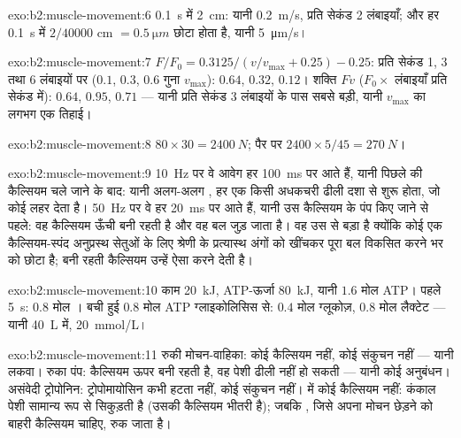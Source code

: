 \begin{solution}{exo:b2:muscle-movement:6}
\qty{0.1}{s} में \qty{2}{cm}: यानी \qty{0.2}{m/s}, प्रति सेकंड 2 लंबाइयाँ; और हर
 \qty{0.1}{s} में $2/\num{40000}$ cm $= \qty{0.5}{\micro m}$ छोटा
होता है, यानी \qty{5}{\micro m/s}।
\end{solution}

\begin{solution}{exo:b2:muscle-movement:7}
$F/F_0 = 0.3125/(v/v_{\max} + 0.25) - 0.25$: प्रति सेकंड 1, 3 तथा 6
लंबाइयों पर ($0.1$, $0.3$, $0.6$ गुना $v_{\max}$): $0.64$, $0.32$, $0.12$।
शक्ति $Fv$ ($F_0\times$ लंबाइयाँ प्रति सेकंड में): $0.64$, $0.95$, $0.71$
--- यानी प्रति सेकंड 3 लंबाइयों के पास सबसे बड़ी, यानी $v_{\max}$ का लगभग एक तिहाई।
\end{solution}

\begin{solution}{exo:b2:muscle-movement:8}
$80\times 30 = \qty{2400}{N}$; पैर पर $2400\times 5/45 =
\qty{270}{N}$।
\end{solution}

\begin{solution}{exo:b2:muscle-movement:9}
\qty{10}{Hz} पर वे आवेग हर \qty{100}{ms} पर आते हैं, यानी पिछले की
कैल्सियम चले जाने के बाद: यानी अलग-अलग , हर एक किसी अधकचरी
ढीली दशा से शुरू होता, जो कोई लहर देता है।
\qty{50}{Hz} पर वे हर \qty{20}{ms} पर आते हैं, यानी उस कैल्सियम के
पंप किए जाने से पहले: वह कैल्सियम ऊँची बनी रहती है और वह बल जुड़ जाता है। वह
 उस  से बड़ा है क्योंकि कोई एक कैल्सियम-स्पंद
अनुप्रस्थ सेतुओं के लिए श्रेणी के प्रत्यास्थ अंगों को खींचकर
पूरा बल विकसित करने भर को छोटा है; बनी रहती कैल्सियम उन्हें ऐसा करने देती है।
\end{solution}

\begin{solution}{exo:b2:muscle-movement:10}
काम \qty{20}{kJ}, ATP-ऊर्जा \qty{80}{kJ}, यानी $1.6$ मोल ATP। पहले
\qty{5}{s}: $0.8$ मोल । बची हुई $0.8$ मोल ATP
ग्लाइकोलिसिस से: $0.4$ मोल ग्लूकोज़, $0.8$ मोल लैक्टेट --- यानी
\qty{40}{L} में, \qty{20}{mmol/L}।
\end{solution}

\begin{solution}{exo:b2:muscle-movement:11}
रुकी मोचन-वाहिका: कोई कैल्सियम नहीं, कोई संकुचन नहीं --- यानी लकवा।
रुका पंप: कैल्सियम ऊपर बनी रहती है, वह पेशी ढीली नहीं हो सकती --- यानी कोई
अनुबंधन। असंवेदी ट्रोपोनिन: ट्रोपोमायोसिन कभी हटता नहीं, कोई
संकुचन नहीं।  में कोई कैल्सियम नहीं: कंकाल पेशी सामान्य रूप से
सिकुड़ती है (उसकी कैल्सियम भीतरी है); जबकि , जिसे अपना मोचन छेड़ने को
बाहरी कैल्सियम चाहिए, रुक जाता है।
\end{solution}

